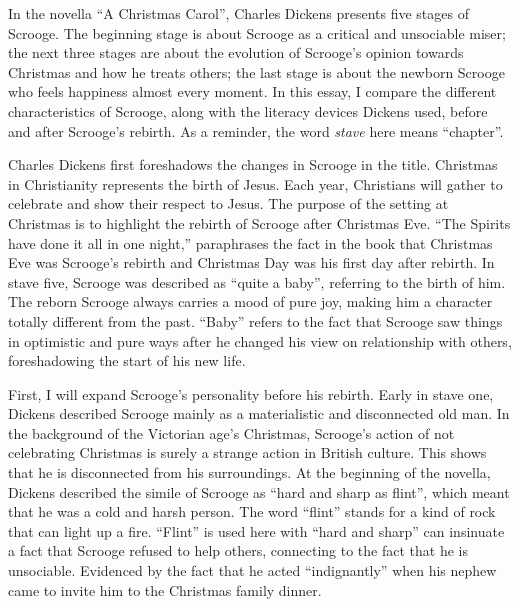 \documentclass[11pt, oneside]{article}   	%
\begin{document}
In the novella ``A Christmas Carol'', Charles Dickens presents five stages of Scrooge. The beginning stage is about Scrooge as a critical and unsociable miser; the next three stages are about the evolution of Scrooge's opinion towards Christmas and how he treats others; the last stage is about the newborn Scrooge who feels happiness almost every moment. In this essay, I compare the different characteristics of Scrooge, along with the literacy devices Dickens used, before and after Scrooge's rebirth. As a reminder, the word \emph{stave} here means ``chapter''. 

Charles Dickens first foreshadows the changes in Scrooge in the title. Christmas in Christianity represents the birth of Jesus. Each year, Christians will gather to celebrate and show their respect to Jesus. The purpose of the setting at Christmas is to highlight the rebirth of Scrooge after Christmas Eve. ``The Spirits have done it all in one night,'' paraphrases the fact in the book that Christmas Eve was Scrooge’s rebirth and Christmas Day was his first day after rebirth. In stave five, Scrooge was described as ``quite a baby'', referring to the birth of him. The reborn Scrooge always carries a mood of pure joy, making him a character totally different from the past. ``Baby'' refers to the fact that Scrooge saw things in optimistic and pure ways after he changed his view on relationship with others, foreshadowing the start of his new life. 

First, I will expand Scrooge's personality before his rebirth. Early in stave one, Dickens described Scrooge mainly as a materialistic and disconnected old man. In the background of the Victorian age's Christmas, Scrooge's action of not celebrating Christmas is surely a strange action in British culture. This shows that he is disconnected from his surroundings. At the beginning of the novella, Dickens described the simile of Scrooge as ``hard and sharp as flint'',  which meant that he was a cold and harsh person. The word ``flint'' stands for a kind of rock that can light up a fire. ``Flint'' is used here with ``hard and sharp'' can insinuate a fact that Scrooge refused to help others, connecting to the fact that he is unsociable. Evidenced by the fact that he acted ``indignantly'' when his nephew came to invite him to the Christmas family dinner. 
\end{document}
